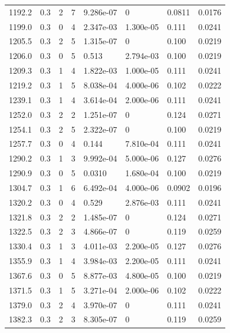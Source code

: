 \documentclass[preview]{standalone}
\begin{document}
{{{\begin{tabular}{L{1.2cm}C{1.2cm} C{0.3cm}C{0.5cm} C{1.4cm}C{1.4cm} C{1.4cm}C{1.4cm}}
  1192.2  &   0.3  & 2     &  7 &  9.286e-07  & 0  & 0.0811 &  0.0176   \\ 
  1199.0  &   0.3  & 0     &  4 &  2.347e-03  & 1.300e-05  & 0.111 &  0.0241   \\ 
  1205.5  &   0.3  & 2     &  5 &  1.315e-07  & 0  & 0.100 &  0.0219   \\ 
  1206.0  &   0.3  & 0     &  5 &  0.513  & 2.794e-03  & 0.100 &  0.0219   \\ 
  1209.3  &   0.3  & 1     &  4 &  1.822e-03  & 1.000e-05  & 0.111 &  0.0241   \\ 
  1219.2  &   0.3  & 1     &  5 &  8.038e-04  & 4.000e-06  & 0.102 &  0.0222   \\ 
  1239.1  &   0.3  & 1     &  4 &  3.614e-04  & 2.000e-06  & 0.111 &  0.0241   \\ 
  1252.0  &   0.3  & 2     &  2 &  1.251e-07  & 0  & 0.124 &  0.0271   \\ 
  1254.1  &   0.3  & 2     &  5 &  2.322e-07  & 0  & 0.100 &  0.0219   \\ 
  1257.7  &   0.3  & 0     &  4 &  0.144  & 7.810e-04  & 0.111 &  0.0241   \\ 
  1290.2  &   0.3  & 1     &  3 &  9.992e-04  & 5.000e-06  & 0.127 &  0.0276   \\ 
  1290.9  &   0.3  & 0     &  5 &  0.0310  & 1.680e-04  & 0.100 &  0.0219   \\ 
  1304.7  &   0.3  & 1     &  6 &  6.492e-04  & 4.000e-06  & 0.0902 &  0.0196   \\ 
  1320.2  &   0.3  & 0     &  4 &  0.529  & 2.876e-03  & 0.111 &  0.0241   \\ 
  1321.8  &   0.3  & 2     &  2 &  1.485e-07  & 0  & 0.124 &  0.0271   \\ 
  1322.5  &   0.3  & 2     &  3 &  4.866e-07  & 0  & 0.119 &  0.0259   \\ 
  1330.4  &   0.3  & 1     &  3 &  4.011e-03  & 2.200e-05  & 0.127 &  0.0276   \\ 
  1355.9  &   0.3  & 1     &  4 &  3.984e-03  & 2.200e-05  & 0.111 &  0.0241   \\ 
  1367.6  &   0.3  & 0     &  5 &  8.877e-03  & 4.800e-05  & 0.100 &  0.0219   \\ 
  1371.5  &   0.3  & 1     &  5 &  3.271e-04  & 2.000e-06  & 0.102 &  0.0222   \\ 
  1379.0  &   0.3  & 2     &  4 &  3.970e-07  & 0  & 0.111 &  0.0241   \\ 
  1382.3  &   0.3  & 2     &  3 &  8.305e-07  & 0  & 0.119 &  0.0259   \\ 

\end{tabular}}}}
\end{document}
